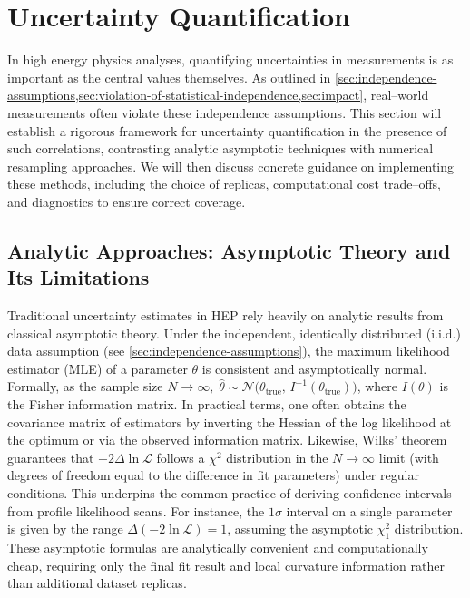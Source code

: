 \section{Uncertainty Quantification}
    In high energy physics analyses, quantifying uncertainties in measurements is as important as the central values themselves.
    As outlined in \cref{sec:independence-assumptions,sec:violation-of-statistical-independence,sec:impact}, real--world measurements often violate these independence assumptions.
    This section will establish a rigorous framework for uncertainty quantification in the presence of such correlations, contrasting analytic asymptotic techniques with numerical resampling approaches.
    We will then discuss concrete guidance on implementing these methods, including the choice of replicas, computational cost trade--offs, and diagnostics to ensure correct coverage.
    \subsection{Analytic Approaches: Asymptotic Theory and Its Limitations}
        Traditional uncertainty estimates in HEP rely heavily on analytic results from classical asymptotic theory.
        Under the independent, identically distributed (i.i.d.) data assumption (see \cref{sec:independence-assumptions}), the maximum likelihood estimator (MLE) of a parameter $\theta$ is consistent and asymptotically normal.
        Formally, as the sample size $N\to\infty,\;\hat{\theta} \sim \mathcal{N}\big(\theta_{\text{true}},\, I^{-1}(\theta_{\text{true}})\big)$, where $I(\theta)$ is the Fisher information matrix.
        In practical terms, one often obtains the covariance matrix of estimators by inverting the Hessian of the log likelihood at the optimum or via the observed information matrix.
        Likewise, Wilks' theorem guarantees that $-2\Delta\ln\mathcal{L}$ follows a $\chi^2$ distribution in the $N\to\infty$ limit (with degrees of freedom equal to the difference in fit parameters) under regular conditions.
        This underpins the common practice of deriving confidence intervals from profile likelihood scans.
        For instance, the $1\sigma$ interval on a single parameter is given by the range $\Delta(-2\ln\mathcal{L}) = 1$, assuming the asymptotic $\chi^2_1$ distribution.
        These asymptotic formulas are analytically convenient and computationally cheap, requiring only the final fit result and local curvature information rather than additional dataset replicas.

